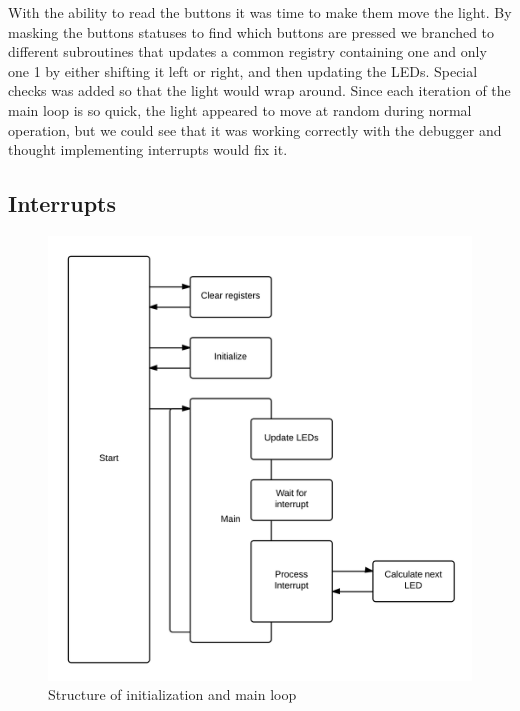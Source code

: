 With the ability to read the buttons it was time to make them move the light. By masking the buttons statuses to find which buttons are pressed we branched to different subroutines that updates a common registry containing one and only one 1 by either shifting it left or right, and then updating the LEDs. Special checks was added so that the light would wrap around. Since each iteration of the main loop is so quick, the light appeared to move at random during normal operation, but we could see that it was working correctly with the debugger and thought implementing interrupts would fix it.
\subsection{Interrupts}


\begin{figure}[phtb]
 
  \centering
    \includegraphics[width=\textwidth]{mainstructure}
 \caption{Structure of initialization and main loop}
 \label{mainstruct}
\end{figure}

